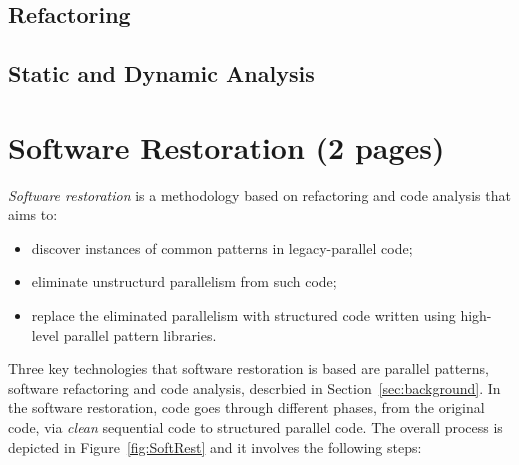 \documentclass{llncs}
\begin{document}
\subsection{Refactoring}

\subsection{Static and Dynamic Analysis}

\section{Software Restoration (2 pages)} \label{sec:softRest}

\noindent
\emph{Software restoration} is a methodology based on refactoring and code analysis that aims to:
\begin{itemize}
\item discover instances of common patterns in legacy-parallel code;
\item eliminate unstructurd parallelism from such code;
  \item replace the eliminated parallelism with structured code written using high-level parallel pattern libraries.
\end{itemize}
Three key technologies that software restoration is based are parallel patterns, software refactoring and code analysis, descrbied in Section~\ref{sec:background}. In the software restoration, code goes through different phases, from the original code, via \emph{clean} sequential code to structured parallel code. The overall process is depicted in Figure~\ref{fig:SoftRest} and it involves the following steps: 
\end{document}

